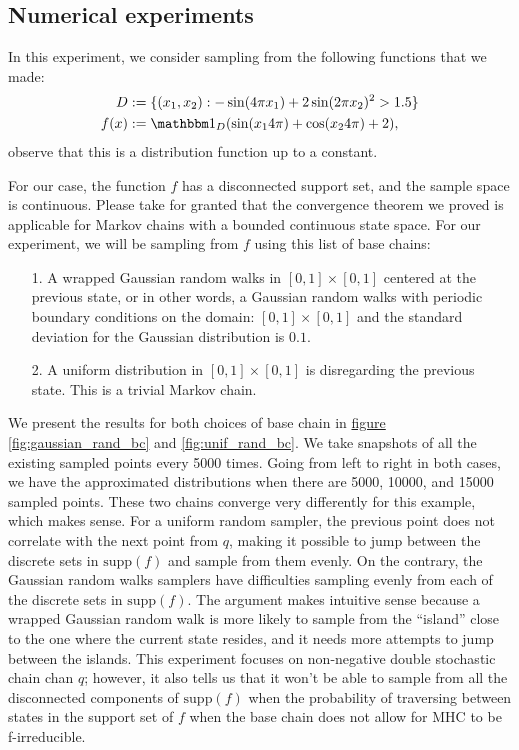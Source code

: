 \documentclass[]{article}
\theoremstyle{definition}
\begin{document}
    \subsection{Numerical experiments}
        In this experiment, we consider sampling from the following functions that we made: 
        \begin{align*}
            D &:= \{(x_1, x_2): -\sin(4\pi x_1) + 2\sin(2\pi x_2)^2 > 1.5\}
            \\
            f(x) &:= \mathbbm 1_D (\sin(x_14\pi) + \cos(x_24\pi) + 2), 
        \end{align*}
        observe that this is a distribution function up to a constant. 
        \par
        For our case, the function $f$ has a disconnected support set, and the sample space is continuous. Please take for granted that the convergence theorem we proved is applicable for Markov chains with a bounded continuous state space. For our experiment, we will be sampling from $f$ using this list of base chains: 
        \begin{itemize}
            \item [1.] A wrapped Gaussian random walks in $[0, 1]\times [0, 1]$ centered at the previous state, or in other words, a Gaussian random walks with periodic boundary conditions on the domain: $[0, 1]\times[0, 1]$ and the standard deviation for the Gaussian distribution is $0.1$. 
            \item [2.] A uniform distribution in $[0, 1]\times [0, 1]$ is disregarding the previous state. This is a trivial Markov chain. 
        \end{itemize}
        We present the results for both choices of base chain in \hyperref[fig:gaussian_rand_bc]{figure \ref*{fig:gaussian_rand_bc}} and \hyperref[fig:unif_rand_bc]{\ref*{fig:unif_rand_bc}}. We take snapshots of all the existing sampled points every 5000 times. Going from left to right in both cases, we have the approximated distributions when there are 5000, 10000, and 15000 sampled points. These two chains converge very differently for this example, which makes sense. For a uniform random sampler, the previous point does not correlate with the next point from $q$, making it possible to jump between the discrete sets in $\text{supp}(f)$ and sample from them evenly. On the contrary, the Gaussian random walks samplers have difficulties sampling evenly from each of the discrete sets in $\text{supp}(f)$. The argument makes intuitive sense because a wrapped Gaussian random walk is more likely to sample from the ``island'' close to the one where the current state resides, and it needs more attempts to jump between the islands. This experiment focuses on non-negative double stochastic chain chan $q$; however, it also tells us that it won't be able to sample from all the disconnected components of $\text{supp}(f)$ when the probability of traversing between states in the support set of $f$ when the base chain does not allow for MHC to be f-irreducible. 
\end{document}

